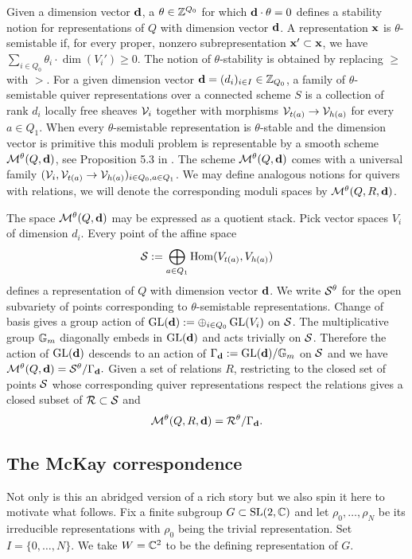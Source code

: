 \documentclass{amsart}
\theoremstyle{definition}
\begin{document}
Given a dimension vector $\mathbf{d}$, a $\theta \in \mathbb{Z}^{Q_0}$ for which $\mathbf{d} \cdot \theta=0$ defines a stability notion for representations of $Q$ with dimension vector $\mathbf{d}$.
A representation $\mathbf{x}$ is $\theta$-semistable if, for every proper, nonzero subrepresentation $\mathbf{x}' \subset \mathbf{x}$, we have $\sum_{i \in Q_0} \theta_i \cdot \dim(V_i') \geq 0$.  
The notion of $\theta$-stability is obtained by replacing $\geq$ with $>$. 
For a given dimension vector $\mathbf{d} =(d_i)_{i \in I} \in \mathbb{Z}_{Q_0}$, a family of $\theta$-semistable quiver representations over a connected scheme $S$ is a collection of rank $d_i$ locally free sheaves $\mathcal{V}_i$ together with morphisms $\mathcal{V}_{t(a)} \rightarrow \mathcal{V}_{h(a)}$ for every $a\in Q_1$. 
When every $\theta$-semistable representation is $\theta$-stable and the dimension vector is primitive this moduli problem is representable by a smooth scheme $\mathcal{M}^\theta(Q, \mathbf{d})$, see Proposition 5.3 in \cite{Ki}.
The scheme $\mathcal{M}^\theta(Q, \mathbf{d})$ comes with a universal family $(\mathcal{V}_i, \mathcal{V}_{t(a)} \rightarrow \mathcal{V}_{h(a)})_{i \in Q_0, a \in Q_1}$. 
We may define analogous notions for quivers with relations, we will denote the corresponding moduli spaces by $\mathcal{M}^\theta(Q,R,\mathbf{d})$.

The space $\mathcal{M}^\theta(Q, \mathbf{d})$ may be expressed as a quotient stack.
Pick vector spaces $V_i$ of dimension $d_i$.
Every point of the affine space
$$\mathcal{S}:= \bigoplus_{a \in Q_1} \operatorname{Hom}(V_{t(a)}, V_{h(a)})$$
defines a representation of $Q$ with dimension vector $\mathbf{d}$.
We write $\mathcal{S}^\theta$ for the open subvariety of points corresponding to $\theta$-semistable representations.
Change of basis gives a group action of $\operatorname{GL}(\mathbf{d}):= \oplus_{i \in Q_0} \operatorname{GL}(V_i)$ on $\mathcal{S}$.
The multiplicative group $\mathbb{G}_m$ diagonally embeds in $\operatorname{GL}(\mathbf{d})$ and acts trivially on $\mathcal{S}$.
Therefore the action of $\operatorname{GL}(\mathbf{d})$ descends to an action of $\Gamma_{\mathbf{d}}:= \operatorname{GL}(\mathbf{d})/\mathbb{G}_m$ on $\mathcal{S}$ and we have $\mathcal{M}^\theta(Q, \mathbf{d}) = \mathcal{S}^\theta / \Gamma_{\mathbf{d}}.$
Given a set of relations $R$, restricting to the closed set of points $\mathcal{S}$ whose corresponding quiver representations respect the relations gives a closed subset of $\mathcal{R} \subset \mathcal{S}$ and $$\mathcal{M}^\theta(Q,R,\mathbf{d})= \mathcal{R}^\theta/\Gamma_{\mathbf{d}}.$$

\subsection{The McKay correspondence}\label{ssc:McKay}
Not only is this an abridged version of a rich story but we also spin it here to motivate what follows.
Fix a finite subgroup $G \subset \operatorname{SL}(2,\mathbb{C})$ and let $\rho_0, \ldots, \rho_N$ be its
irreducible representations with $\rho_0$ being the trivial representation.
Set $I=\{0,\ldots,N\}$.
We take $W=\mathbb{C}^2$ to be the defining representation of $G$.
\end{document}
